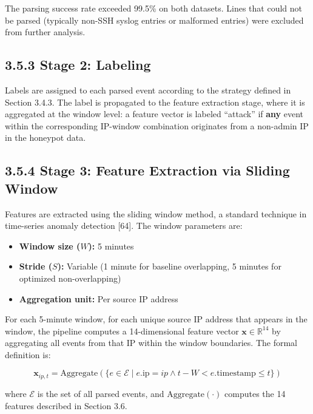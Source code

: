 \documentclass[
  a4paper]{report}
\providecommand{\tightlist}{%
  \setlength{\itemsep}{0pt}\setlength{\parskip}{0pt}}
\begin{document}
The parsing success rate exceeded 99.5\% on both datasets. Lines that
could not be parsed (typically non-SSH syslog entries or malformed
entries) were excluded from further analysis.

\subsection{3.5.3 Stage 2: Labeling}\label{stage-2-labeling}

Labels are assigned to each parsed event according to the strategy
defined in Section 3.4.3. The label is propagated to the feature
extraction stage, where it is aggregated at the window level: a feature
vector is labeled ``attack'' if \textbf{any} event within the
corresponding IP-window combination originates from a non-admin IP in
the honeypot data.

\subsection{3.5.4 Stage 3: Feature Extraction via Sliding
Window}\label{stage-3-feature-extraction-via-sliding-window}

Features are extracted using the sliding window method, a standard
technique in time-series anomaly detection {[}64{]}. The window
parameters are:

\begin{itemize}
\tightlist
\item
  \textbf{Window size (\(W\)):} 5 minutes
\item
  \textbf{Stride (\(S\)):} Variable (1 minute for baseline overlapping,
  5 minutes for optimized non-overlapping)
\item
  \textbf{Aggregation unit:} Per source IP address
\end{itemize}

For each 5-minute window, for each unique source IP address that appears
in the window, the pipeline computes a 14-dimensional feature vector
\(\mathbf{x} \in \mathbb{R}^{14}\) by aggregating all events from that
IP within the window boundaries. The formal definition is:

\[\mathbf{x}_{ip,t} = \text{Aggregate}(\{e \in \mathcal{E} \mid e.\text{ip} = ip \wedge t - W < e.\text{timestamp} \leq t\})\]

where \(\mathcal{E}\) is the set of all parsed events, and
\(\text{Aggregate}(\cdot)\) computes the 14 features described in
Section 3.6.
\end{document}
